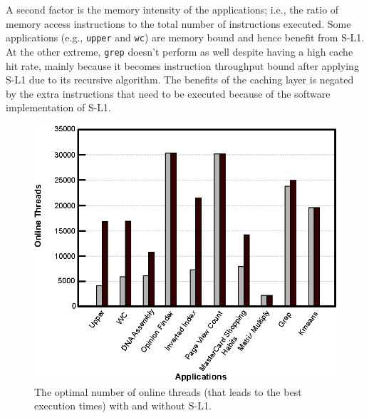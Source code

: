 A second factor is the memory intensity of the applications; i.e., the ratio of memory access instructions to the total number of instructions executed.
Some applications (e.g., \texttt{upper} and \texttt{wc}) are memory bound and hence benefit from S-L1.
At the other extreme, \texttt{grep} doesn't perform as well despite having a
high cache hit rate, mainly because it becomes instruction throughput bound
after applying S-L1 due to its recursive algorithm. The benefits of the
caching layer is negated by the extra instructions that need to be executed
because of the software implementation of S-L1.



\begin{figure}[t]
\center
\includegraphics[scale=0.75]{8higherParallelism.eps}
\vspace{-0.0cm}
\caption{\footnotesize\textnormal{The optimal number of online threads (that leads to the best execution times) with and without S-L1.}}
\label{fig:levelprallelism}
\end{figure}


